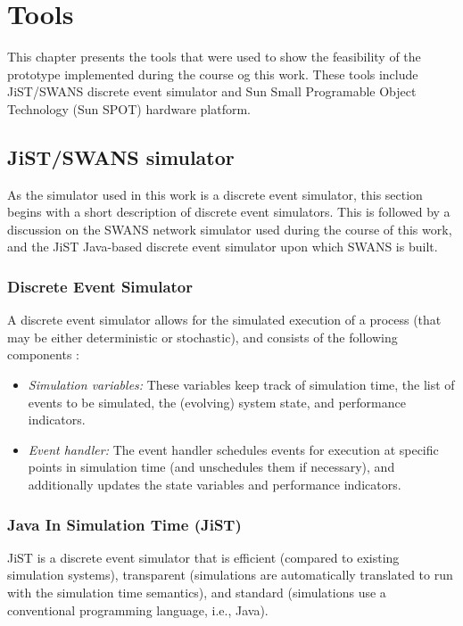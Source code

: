 \chapter{Tools} \label{chap:tools}

This chapter presents the tools that were used to show the feasibility of the
prototype implemented during the course og this work. These tools include
JiST/SWANS discrete event simulator and Sun Small Programable Object
Technology (Sun SPOT) hardware platform. 

\section {JiST/SWANS simulator} \label{sec:jistswans}

As the simulator used in this work is a discrete event simulator, this section
begins with a short description of discrete event simulators. This is followed by
a discussion on the SWANS network simulator used during the course of this work,
and the JiST Java-based discrete event simulator upon which SWANS is built.

\subsection{Discrete Event Simulator}

A discrete event simulator allows for the simulated execution of a process (that
may be either deterministic or stochastic), and consists of the following
components \cite{Shankar_DiscreteEventSim}:

\begin{itemize}
  \item \emph{Simulation variables:} These variables keep track of simulation 
  time, the list of events to be simulated, the (evolving) system state, and 
  performance indicators.
  \item \emph{Event handler:} The event handler schedules events for execution 
  at specific points in simulation time (and unschedules them if necessary), 
  and additionally updates the state variables and performance indicators.
\end{itemize}
 
\subsection{Java In Simulation Time (JiST)} \label{subsec:jist}

JiST \cite{barr_JIST:2005} is a discrete event simulator that is 
efficient (compared to existing simulation systems), 
transparent (simulations are automatically translated to run with the 
simulation time semantics), and standard (simulations use a
conventional programming language, i.e., Java).


